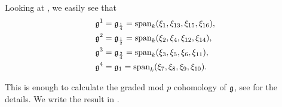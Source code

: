 Looking at , we easily see that
\begin{align*}
  \mathfrak{g}^{1} &= \mathfrak{g}_{\frac{1}{4}} = \operatorname{span}_{k}(\xi_{1},\xi_{13},\xi_{15},\xi_{16}), \\
  \mathfrak{g}^{2} &= \mathfrak{g}_{\frac{1}{2}} = \operatorname{span}_{k}(\xi_{2},\xi_{4},\xi_{12},\xi_{14}), \\
  \mathfrak{g}^{3} &= \mathfrak{g}_{\frac{3}{4}} = \operatorname{span}_{k}(\xi_{3},\xi_{5},\xi_{6},\xi_{11}), \\
  \mathfrak{g}^{4} &= \mathfrak{g}_{1} = \operatorname{span}_{k}(\xi_{7},\xi_{8},\xi_{9},\xi_{10}).
\end{align*}

This is enough to calculate the graded mod $p$ cohomology of $\mathfrak{g}$, see \cite{code} for the details. We write the result in .

